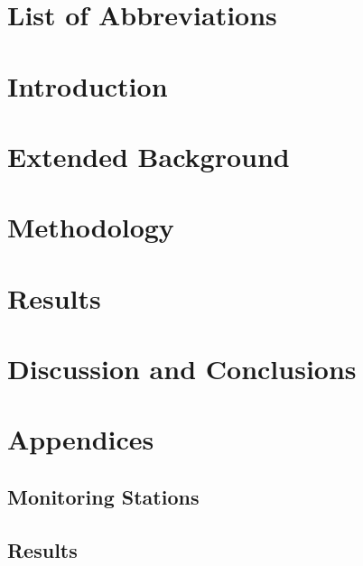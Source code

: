 \documentclass[12pt]{report}
\numberwithin{equation}{section}
\begin{document}
\listoftables
\thispagestyle{plain}

\chapter*{List of Abbreviations}


\chapter{Introduction}
\setcounter{page}{1}


\chapter{Extended Background}


\chapter{Methodology}


\chapter{Results}


\chapter{Discussion and Conclusions}


{}

%

%
\chapter*{Appendices}
\setcounter{section}{0}
\renewcommand\thesection{\Alph{section}}

\section{Monitoring Stations}

\section{Results}
\end{document}
